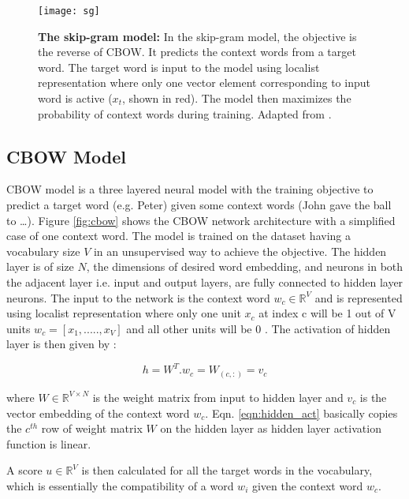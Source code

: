 \begin{figure}[hbtp]
\centering
\texttt{[image: sg]}
\caption[The Skip-gram model]{\textbf{The skip-gram model: }In the skip-gram model, the objective is the reverse of CBOW. It predicts the context words from a target word. The target word is input to the model using localist representation where only one vector element corresponding to input word is active ($x_{t}$, shown in red). The model then maximizes the probability of context words during training. Adapted from \cite{w2v:parameter_learning}.}
\label{fig:sg}
\end{figure}

\subsection{CBOW Model}

CBOW  model is a three layered neural model with the training objective to predict a target word (e.g. Peter) given some context words (John gave the ball to …). Figure \ref{fig:cbow} shows the CBOW network architecture with a simplified case of one context word. The model is trained on the dataset having a vocabulary size $V$ in an unsupervised way to achieve the objective. The hidden layer is of size $N$, the dimensions of desired word embedding, and neurons in both the adjacent layer i.e. input and output layers,  are fully connected to hidden layer neurons. The input to the network is the context word $w_c {\in} \mathbb{R}^{V}$ and is represented using localist representation where only one unit $x_c$ at index c will be 1 out of V units $w_c=[{x_1,.....,x_V}]$ and all other units will be 0 \cite{w2v:parameter_learning}. The activation of hidden layer is then given by :


\begin{equation}\label{eqn:hidden_act}
    h = W^T . w_c= W_{(c,:)}=v_{c}
\end{equation}

where $W {\in} \mathbb{R}^{V{\times}N}$ is the weight matrix from input to hidden layer and $v_{c}$ is the vector embedding of the context word $w_c$. Eqn. \ref{eqn:hidden_act} basically copies the $c^{th}$ row of weight matrix $W$ on the hidden layer as hidden layer activation function is linear. 

A score $u {\in}\mathbb{R}^V$ is then calculated for all the target words in the vocabulary, which is essentially the compatibility of a word $w_i$ given the context word $w_c$.

